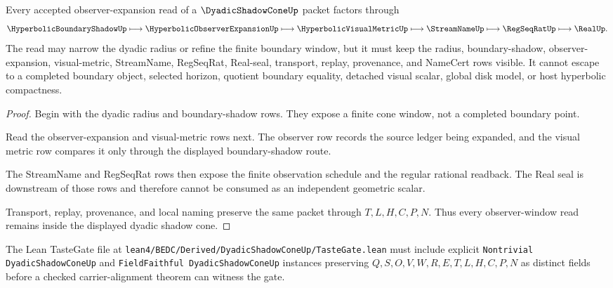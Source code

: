 \begin{theorem}
\label{thm:dyadic-shadow-cone-observer-window-nonescape}
Every accepted observer-expansion read of a $\DyadicShadowConeUp$ packet factors through
$$
\HyperbolicBoundaryShadowUp
\longmapsto
\HyperbolicObserverExpansionUp
\longmapsto
\HyperbolicVisualMetricUp
\longmapsto
\StreamNameUp
\longmapsto
\RegSeqRatUp
\longmapsto
\RealUp .
$$
The read may narrow the dyadic radius or refine the finite boundary window, but it must keep the radius, boundary-shadow, observer-expansion, visual-metric, StreamName, RegSeqRat, Real-seal, transport, replay, provenance, and NameCert rows visible. It cannot escape to a completed boundary object, selected horizon, quotient boundary equality, detached visual scalar, global disk model, or host hyperbolic compactness.
\end{theorem}
\begin{proof}
Begin with the dyadic radius and boundary-shadow rows. They expose a finite cone window, not a completed boundary point.

Read the observer-expansion and visual-metric rows next. The observer row records the source ledger being expanded, and the visual metric row compares it only through the displayed boundary-shadow route.

The StreamName and RegSeqRat rows then expose the finite observation schedule and the regular rational readback. The Real seal is downstream of those rows and therefore cannot be consumed as an independent geometric scalar.

Transport, replay, provenance, and local naming preserve the same packet through $T,L,H,C,P,N$. Thus every observer-window read remains inside the displayed dyadic shadow cone.
\end{proof}

The Lean TasteGate file at \texttt{lean4/BEDC/Derived/DyadicShadowConeUp/TasteGate.lean} must include explicit \texttt{Nontrivial DyadicShadowConeUp} and \texttt{FieldFaithful DyadicShadowConeUp} instances preserving $Q,S,O,V,W,R,E,T,L,H,C,P,N$ as distinct fields before a checked carrier-alignment theorem can witness the gate.


